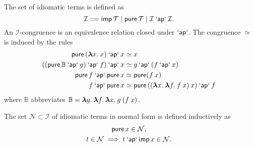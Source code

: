 \begin{definition}
The set of idiomatic terms is defined as
\begin{equation}
	\mathcal{I} ::= \simp \mathcal{T} \mid \spure \mathcal{T} \mid
		\mathcal{I} \sap \mathcal{I}.
\end{equation}
An $\mathcal{I}$-congruence is an equivalence relation closed under $\sap$.
The congruence $\simeq$ is induced by the rules
\begin{align}
	\spure{(\sabs{x}{x})} \sap x &\simeq x \label{eq:term-id}\\
	((\spure \mathbb{B} \sap g) \sap f) \sap x &\simeq g \sap (f \sap x) \label{eq:term-comp}\\
	\spure f \sap \spure x &\simeq \spure (f \sapp x) \label{eq:term-morph}\\
	f \sap \spure x &\simeq \spure{((\sabs{x}\sabs{f}{f \sapp x}) \sapp x)} \sap f \label{eq:term-xchng}
\end{align}
where $\mathbb{B}$ abbreviates
$\mathbb{B} = \sabs{g}{\sabs{f}{\sabs{x}{g \sapp (f \sapp x)}}}$.
\end{definition}

\begin{definition}
The set $\mathcal{N} \subset \mathcal{I}$ of idiomatic terms in normal form is
defined inductively as
\begin{gather}
	\spure x \in \mathcal{N}, \label{eq:nf-base}\\
	t \in \mathcal{N} \implies t \sap \simp x \in \mathcal{N}. \label{eq:nf-step}
\end{gather}
\end{definition}

